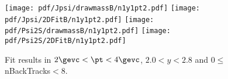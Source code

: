 \begin{figure}[H]
\begin{center}
\texttt{[image: pdf/Jpsi/drawmassB/n1y1pt2.pdf]}
\texttt{[image: pdf/Jpsi/2DFitB/n1y1pt2.pdf]}
\vspace*{-0.5cm}
\texttt{[image: pdf/Psi2S/drawmassB/n1y1pt2.pdf]}
\texttt{[image: pdf/Psi2S/2DFitB/n1y1pt2.pdf]}
\vspace*{-0.5cm}
\end{center}
\caption{Fit results in $2\gevc<\pt<4\gevc$, $2.0<y<2.8$ and 0$\leq$nBackTracks$<$8.}
\label{Fitn1y1pt2}
\end{figure}

